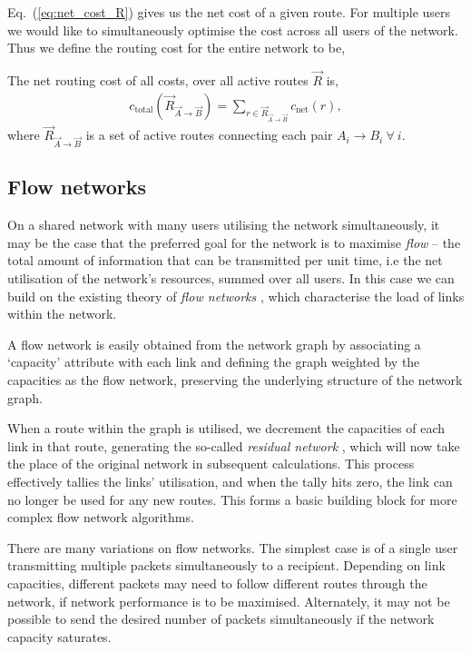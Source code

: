 Eq.~(\ref{eq:net_cost_R}) gives us the net cost of a given route. For multiple users we would like to simultaneously optimise the cost across all users of the network. Thus we define the routing cost for the entire network to be,
\begin{definition}
	The net routing cost of all costs, over all active routes $\vec{R}$ is,
\begin{align} \label{eq:c_total}
c_\text{total}(\vec{R}_{\vec{A}\to \vec{B}}) = \sum_{r \in {\vec R}_{\vec{A}\to \vec{B}}} c_\text{net}(r),
\end{align}
where $\vec{R}_{\vec{A}\to \vec{B}}$ is a set of active routes connecting each pair \mbox{$A_i\to B_i~\forall ~ i$}.
\end{definition}

%
%

\subsection{Flow networks} \label{sec:flow_networks} 

On a shared network with many users utilising the network simultaneously, it may be the case that the preferred goal for the network is to maximise \textit{flow} \cite{???} -- the total amount of information that can be transmitted per unit time, i.e the net utilisation of the network's resources, summed over all users. In this case we can build on the existing theory of \textit{flow networks} \cite{???}, which characterise the load of links within the network.

A flow network is easily obtained from the network graph by associating a `capacity' attribute with each link and defining the graph weighted by the capacities as the flow network, preserving the underlying structure of the network graph.

When a route within the graph is utilised, we decrement the capacities of each link in that route, generating the so-called \textit{residual network} \cite{???}, which will now take the place of the original network in subsequent calculations. This process effectively tallies the links' utilisation, and when the tally hits zero, the link can no longer be used for any new routes. This forms a basic building block for more complex flow network algorithms.

There are many variations on flow networks. The simplest case is of a single user transmitting multiple packets simultaneously to a recipient. Depending on link capacities, different packets may need to follow different routes through the network, if network performance is to be maximised. Alternately, it may not be possible to send the desired number of packets simultaneously if the network capacity saturates.

